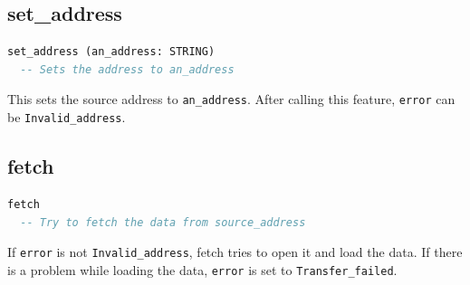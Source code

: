\documentclass[a4paper,fleqn]{report}
\begin{document}
\subsection{set\_address}
\label{sec:set_address}

\begin{lstlisting}[language=Eiffel]
set_address (an_address: STRING)
  -- Sets the address to an_address
\end{lstlisting}

This sets the source address to \texttt{an\_address}. After calling
this feature, \texttt{error} can be \texttt{Invalid\_address}.


\subsection{fetch}
\label{sec:fetch}

\begin{lstlisting}[language=Eiffel]
fetch
  -- Try to fetch the data from source_address
\end{lstlisting}

If \texttt{error} is not \texttt{Invalid\_address}, fetch tries to
open it and load the data. If there is a problem while loading the
data, \texttt{error} is set to \texttt{Transfer\_failed}.
\end{document}
